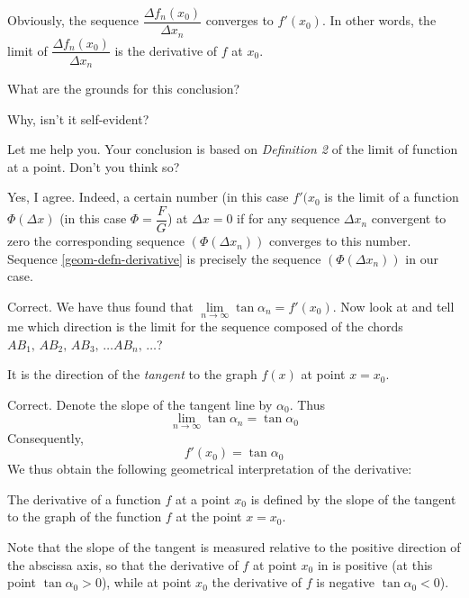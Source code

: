 \rdr Obviously, the sequence $\dfrac{\Delta f_{n} (x_{0})}{\Delta x_{n}}$ converges to $f' (x_{0})$. In other words, the limit of  $\dfrac{\Delta f_{n} (x_{0})}{\Delta x_{n}}$ is the derivative of $f$ at $x_{0}$. 

\athr What are the grounds for this conclusion? 

\rdr Why, isn't it self-evident? 

\athr Let me help you. Your conclusion is based
on \emph{Definition 2} of the limit of function at a point. Don't you think so?

\rdr Yes, I agree. Indeed, a certain number (in this case $f' (x_{0}$ is the limit of a function $\Phi (\Delta x)$ (in this case $\Phi = \dfrac{F}{G}$) at $\Delta x = 0$ if for any sequence $\Delta x_{n}$ convergent to zero the corresponding sequence $(\Phi (\Delta x_{n}))$ converges to this number. Sequence \eqref{geom-defn-derivative} is precisely the sequence $(\Phi (\Delta x_{n}))$ in our case.

\athr Correct. We have thus found that $\lim\limits_{n \to \infty} \tan \alpha_{n} = f' (x_{0})$. Now look at  and tell me which direction is the limit for the sequence composed of the chords  $AB_{1}, \, AB_{2}, \,  AB_{3},  \, \ldots AB_{n},  \, \ldots$? 

\rdr It is the direction of the \emph{tangent} to the graph $f (x)$ at point $x = x_{0}$.

\athr Correct. Denote the slope of the tangent line by $\alpha_{0}$. Thus
\begin{equation*}%
\lim\limits_{n \to \infty} \tan \alpha_{n} = \tan \alpha_{0}
\end{equation*}
Consequently,
\begin{equation*}%
f' (x_{0}) = \tan \alpha_{0}
\end{equation*}
We thus obtain the following geometrical interpretation of the derivative:
\begin{mytheo}{}
The derivative of a function $f$ at a point $x_{0}$ is defined by the slope of the tangent to the graph of the function $f$ at the point $x = x_{0}$.
\end{mytheo}

Note that the slope of the tangent is measured relative to the positive direction of the abscissa axis, so that the derivative of $f$ at point $x_{0}$ in  is positive (at this point $\tan \alpha_{0} > 0$), while at point $x_{0}$ the derivative of $f$ is negative $\tan \alpha_{0} < 0$).


